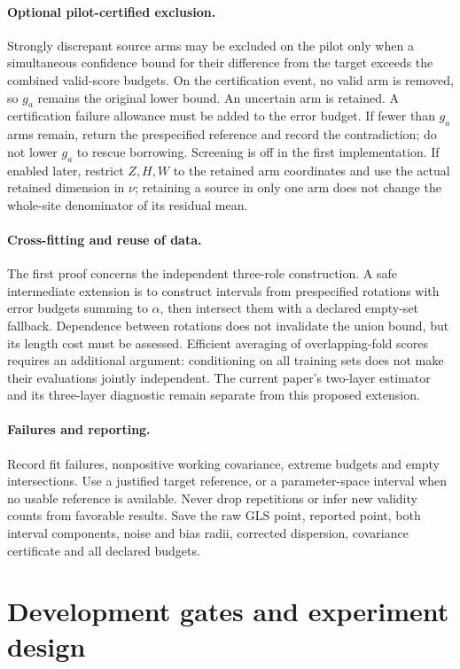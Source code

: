 \paragraph{Optional pilot-certified exclusion.}
Strongly discrepant source arms may be excluded on the pilot only when a
simultaneous confidence bound for their difference from the target exceeds
the combined valid-score budgets. On the certification event, no valid arm
is removed, so $g_a$ remains the original lower bound. An uncertain arm is
retained. A certification failure allowance must be added to the error budget.
If fewer than $g_a$ arms remain, return the prespecified reference and record
the contradiction; do not lower $g_a$ to rescue borrowing. Screening is off
in the first implementation.
If enabled later, restrict $Z,H,W$ to the retained arm coordinates and use
the actual retained dimension in $\nu$; retaining a source in only one arm
does not change the whole-site denominator of its residual mean.

\paragraph{Cross-fitting and reuse of data.}
The first proof concerns the independent three-role construction. A safe
intermediate extension is to construct intervals from prespecified rotations
with error budgets summing to $\alpha$, then intersect them with a declared
empty-set fallback. Dependence between rotations does not invalidate the
union bound, but its length cost must be assessed. Efficient averaging of
overlapping-fold scores requires an additional argument: conditioning on
all training sets does not make their evaluations jointly independent.
The current paper's two-layer estimator and its three-layer diagnostic remain
separate from this proposed extension.

\paragraph{Failures and reporting.}
Record fit failures, nonpositive working covariance, extreme budgets and
empty intersections. Use a justified target reference, or a parameter-space
interval when no usable reference is available. Never drop repetitions or
infer new validity counts from favorable results. Save the raw GLS point,
reported point, both interval components, noise and bias radii, corrected
dispersion, covariance certificate and all declared budgets.

\section{Development gates and experiment design}

